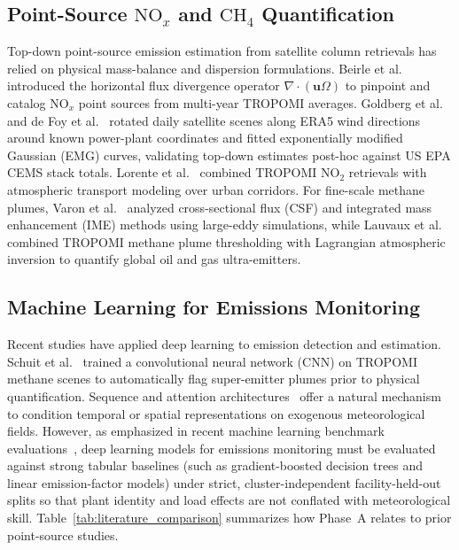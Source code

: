 \documentclass[conference]{IEEEtran}
\begin{document}
\subsection{Point-Source $\text{NO}_x$ and $\text{CH}_4$ Quantification}
Top-down point-source emission estimation from satellite column retrievals has relied on physical mass-balance and dispersion formulations. Beirle et al.~\cite{beirle2011megacity, beirle2019pinpointing, beirle2021catalog} introduced the horizontal flux divergence operator $\nabla \cdot (\mathbf{u}\Omega)$ to pinpoint and catalog $\text{NO}_x$ point sources from multi-year TROPOMI averages. Goldberg et al.~\cite{goldberg2019high, goldberg2022using} and de Foy et al.~\cite{defoy2015estimating} rotated daily satellite scenes along ERA5 wind directions around known power-plant coordinates and fitted exponentially modified Gaussian (EMG) curves, validating top-down estimates post-hoc against US EPA CEMS stack totals. Lorente et al.~\cite{lorente2019quantifying} combined TROPOMI $\text{NO}_2$ retrievals with atmospheric transport modeling over urban corridors. For fine-scale methane plumes, Varon et al.~\cite{varon2018quantifying, varon2020high} analyzed cross-sectional flux (CSF) and integrated mass enhancement (IME) methods using large-eddy simulations, while Lauvaux et al.~\cite{lauvaux2022global} combined TROPOMI methane plume thresholding with Lagrangian atmospheric inversion to quantify global oil and gas ultra-emitters.

\subsection{Machine Learning for Emissions Monitoring}
Recent studies have applied deep learning to emission detection and estimation. Schuit et al.~\cite{schuit2023automated} trained a convolutional neural network (CNN) on TROPOMI methane scenes to automatically flag super-emitter plumes prior to physical quantification. Sequence and attention architectures~\cite{vaswani2017attention, dosovitskiy2020image} offer a natural mechanism to condition temporal or spatial representations on exogenous meteorological fields. However, as emphasized in recent machine learning benchmark evaluations~\cite{grinsztajn2022why, shwartzziv2022tabular}, deep learning models for emissions monitoring must be evaluated against strong tabular baselines (such as gradient-boosted decision trees and linear emission-factor models) under strict, cluster-independent facility-held-out splits so that plant identity and load effects are not conflated with meteorological skill. Table~\ref{tab:literature_comparison} summarizes how Phase~A relates to prior point-source studies.
\end{document}
